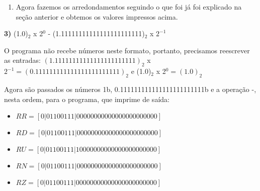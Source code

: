 \documentclass[11pt]{article}
\begin{document}
\begin{enumerate}
  \item Agora fazemos os arredondamentos seguindo o que foi já foi explicado na seção anterior e obtemos os valores impressos acima.
\end{enumerate}

\textbf{3)} (1.0)$_2 $ x 2$^0$ - (1.11111111111111111111111)$_2$ x $2^{-1} $

O programa não recebe números neste formato, portanto, precisamos reescrever as entradas:
$(1.11111111111111111111111)_2$ x $2^{-1} = (0.111111111111111111111111)_2$ e
(1.0)$_2 $ x 2$^0 = (1.0)_2$

Agora são passados os números 1b, 0.111111111111111111111111b e a operação -, nesta ordem, para o programa, que imprime de saída:

\begin{itemize}
  \item {\small$ RR = [ 0 | 0 1 1 0 0 1 1 1 | 0 0 0 0 0 0 0 0 0 0 0 0 0 0 0 0 0 0 0 0 0 0 0 ] $}
  \item {\small$ RD = [ 0 | 0 1 1 0 0 1 1 1 | 0 0 0 0 0 0 0 0 0 0 0 0 0 0 0 0 0 0 0 0 0 0 0 ] $}
  \item {\small$ RU = [ 0 | 0 1 1 0 0 1 1 1 | 1 0 0 0 0 0 0 0 0 0 0 0 0 0 0 0 0 0 0 0 0 0 0 ] $}
  \item {\small$ RN = [ 0 | 0 1 1 0 0 1 1 1 | 0 0 0 0 0 0 0 0 0 0 0 0 0 0 0 0 0 0 0 0 0 0 0 ] $}
  \item {\small$ RZ = [ 0 | 0 1 1 0 0 1 1 1 | 0 0 0 0 0 0 0 0 0 0 0 0 0 0 0 0 0 0 0 0 0 0 0 ] $}
\end{itemize}
\end{document}
